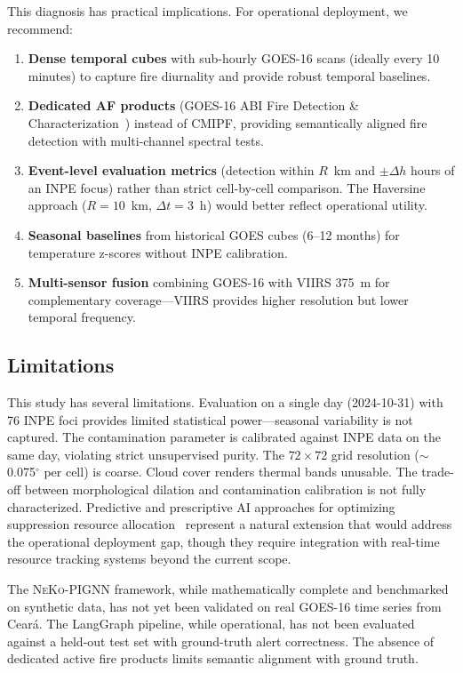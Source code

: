 \documentclass[5p,twocolumn]{elsarticle}
\newcommand{\abbrev}[1]{{\small\textsc{#1}}}
\begin{document}
This diagnosis has practical implications. For operational deployment, we recommend:
\begin{enumerate}
  \item \textbf{Dense temporal cubes} with sub-hourly \abbrev{GOES-16} scans (ideally every 10 minutes) to capture fire diurnality and provide robust temporal baselines.
  \item \textbf{Dedicated \abbrev{AF} products} (\abbrev{GOES-16} \abbrev{ABI} Fire Detection \& Characterization~\cite{schmidt2021}) instead of \abbrev{CMIPF}, providing semantically aligned fire detection with multi-channel spectral tests.
  \item \textbf{Event-level evaluation metrics} (detection within $R$~km and $\pm \Delta h$ hours of an \abbrev{INPE} focus) rather than strict cell-by-cell comparison. The Haversine approach ($R = 10$~km, $\Delta t = 3$~h) would better reflect operational utility.
  \item \textbf{Seasonal baselines} from historical \abbrev{GOES} cubes (6--12 months) for temperature z-scores without \abbrev{INPE} calibration.
  \item \textbf{Multi-sensor fusion} combining \abbrev{GOES-16} with \abbrev{VIIRS} 375~m for complementary coverage---\abbrev{VIIRS} provides higher resolution but lower temporal frequency.
\end{enumerate}

\subsection{Limitations}

This study has several limitations. Evaluation on a single day (2024-10-31) with 76 \abbrev{INPE} foci provides limited statistical power---seasonal variability is not captured. The contamination parameter is calibrated against \abbrev{INPE} data on the same day, violating strict unsupervised purity. The $72\times 72$ grid resolution ($\sim$0.075$^\circ$ per cell) is coarse. Cloud cover renders thermal bands unusable. The trade-off between morphological dilation and contamination calibration is not fully characterized. Predictive and prescriptive AI approaches for optimizing suppression resource allocation~\cite{boussioux2026} represent a natural extension that would address the operational deployment gap, though they require integration with real-time resource tracking systems beyond the current scope.

The \abbrev{NeKo-PIGNN} framework, while mathematically complete and benchmarked on synthetic data, has not yet been validated on real \abbrev{GOES-16} time series from Cear\'{a}. The LangGraph pipeline, while operational, has not been evaluated against a held-out test set with ground-truth alert correctness. The absence of dedicated active fire products limits semantic alignment with ground truth.
\end{document}
